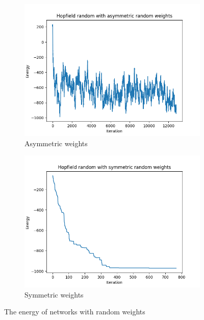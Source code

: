 \documentclass[a4paper]{article}
\begin{document}
\begin{figure}[!htb]
    \centering
    \begin{subfigure}[b]{0.48\textwidth}
        \includegraphics[width=\textwidth]{Labs/Lab 3/images/energies-asymmetric.png}
        \caption{Asymmetric weights}
    \end{subfigure}%
    \hfill
    \begin{subfigure}[b]{0.48\textwidth}
        \centering
        \includegraphics[width=\textwidth]{Labs/Lab 3/images/energies-symmetric.png}
        \caption{Symmetric weights}
        \label{fig:symmetric}
    \end{subfigure}
    \caption{The energy of networks with random weights}
    \label{fig:energies-random-weights}
\end{figure}
\end{document}
